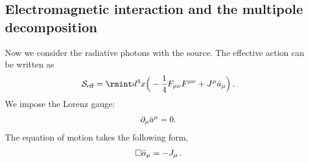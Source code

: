 \subsection{Electromagnetic interaction and the multipole decomposition}\label{emRad}
Now we consider the radiative photons with the source.  %
The effective action can be written as
\begin{align}
    \begin{split}
        \mathcal{S}_{\text{eff}}=\rmint d^4 x \Big(-\frac{1}{4}F_{\mu\nu}F^{\mu\nu}+J^{\mu}\Bar{a}_{\mu}\Big)\,.
    \end{split}
\end{align}
We impose the Lorenz gauge: $$\partial_{\mu}\Bar{a}^{\mu}=0.$$ The equation of motion takes the following form,
\begin{eqnarray}
    \Box\Bar{a}_{\mu}=-J_{\mu}\,.
\end{eqnarray}


